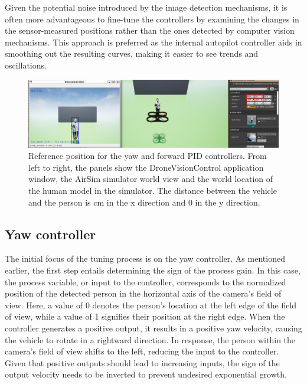 Given the potential noise introduced by the image detection mechanisms, it is often more advantageous to fine-tune the controllers by examining the changes in the sensor-measured positions rather than the ones detected by computer vision mechanisms. This approach is preferred as the internal autopilot controller aids in smoothing out the resulting curves, making it easier to see trends and oscillations.



\begin{figure}[H]
  \centering
  \includegraphics[width=\textwidth, keepaspectratio]{img/pid-3/tune-ref-pos.png}
  \caption{Reference position for the yaw and forward PID controllers. From left to right, the panels show the DroneVisionControl application window, the AirSim simulator world view and the world location of the human model in the simulator. The distance between the vehicle and the person is \unit[420]{cm} in the x direction and 0 in the y direction.}
  \label{fig:tune-start-pos}
\end{figure}


\subsection{Yaw controller}

The initial focus of the tuning process is on the yaw controller. As mentioned earlier, the first step entails determining the sign of the process gain. In this case, the process variable, or input to the controller, corresponds to the normalized position of the detected person in the horizontal axis of the camera's field of view. Here, a value of 0 denotes the person's location at the left edge of the field of view, while a value of 1 signifies their position at the right edge. When the controller generates a positive output, it results in a positive yaw velocity, causing the vehicle to rotate in a rightward direction. In response, the person within the camera's field of view shifts to the left, reducing the input to the controller. Given that positive outputs should lead to increasing inputs, the sign of the output velocity needs to be inverted to prevent undesired exponential growth.

